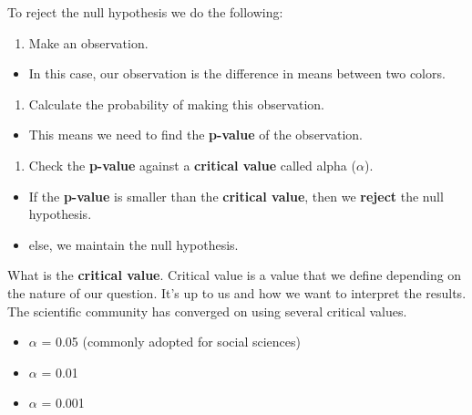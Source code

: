 \documentclass[
]{book}
\providecommand{\tightlist}{%
  \setlength{\itemsep}{0pt}\setlength{\parskip}{0pt}}
\begin{document}
To reject the null hypothesis we do the following:

\begin{enumerate}
\def\labelenumi{\arabic{enumi}.}
\tightlist
\item
  Make an observation.
\end{enumerate}

\begin{itemize}
\tightlist
\item
  In this case, our observation is the difference in means between two colors.
\end{itemize}

\begin{enumerate}
\def\labelenumi{\arabic{enumi}.}
\setcounter{enumi}{1}
\tightlist
\item
  Calculate the probability of making this observation.
\end{enumerate}

\begin{itemize}
\tightlist
\item
  This means we need to find the \textbf{p-value} of the observation.
\end{itemize}

\begin{enumerate}
\def\labelenumi{\arabic{enumi}.}
\setcounter{enumi}{2}
\tightlist
\item
  Check the \textbf{p-value} against a \textbf{critical value} called alpha (\(\alpha\)).
\end{enumerate}

\begin{itemize}
\tightlist
\item
  If the \textbf{p-value} is smaller than the \textbf{critical value}, then we \textbf{reject} the null hypothesis.
\item
  else, we maintain the null hypothesis.
\end{itemize}

What is the \textbf{critical value}. Critical value is a value that we define depending on the nature of our question. It's up to us and how we want to interpret the results. The scientific community has converged on using several critical values.

\begin{itemize}
\tightlist
\item
  \(\alpha\) = 0.05 (commonly adopted for social sciences)
\item
  \(\alpha\) = 0.01
\item
  \(\alpha\) = 0.001
\end{itemize}
\end{document}
